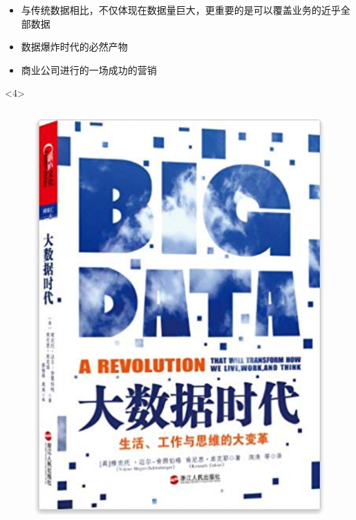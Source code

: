 \documentclass{beamerthemeMono}
\begin{document}
\begin{frame}[t]{\subsecname}
\begin{itemize}
\item<1-> 与传统数据相比，不仅体现在数据量巨大，更重要的是可以覆盖业务的近乎全部数据
\item<2-> 数据爆炸时代的必然产物
\item<3-> 商业公司进行的一场成功的营销 
\end{itemize}

\begin{overlayarea}{\textwidth}{\textheight}
  \begin{onlyenv}<4>
     \begin{columns}
       \begin{column}{.3\textwidth}
       \begin{figure}
         \centering \includegraphics[width=\columnwidth]{chp01_bigdatabook.png}
       \end{figure}
       \end{column}

\end{columns}
\end{onlyenv}
\end{overlayarea}
\end{frame}
\end{document}
